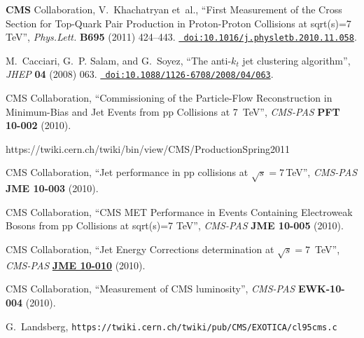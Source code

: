 \begin{thebibliography}{10}
{\bf CMS} Collaboration, V.~Khachatryan {et~al.}, ``{First Measurement of the
  Cross Section for Top-Quark Pair Production in Proton-Proton Collisions at
  sqrt(s)=7 TeV}'', {\em Phys.Lett.} {\bf B695} (2011) 424--443.
  \href{http://dx.doi.org/10.1016/j.physletb.2010.11.058}{{\tt
  doi:10.1016/j.physletb.2010.11.058}}.

M.~Cacciari, G.~P. Salam, and G.~Soyez, ``{The anti-{$k_t$} jet clustering
  algorithm}'', {\em JHEP} {\bf 04} (2008)
063.
  \href{http://dx.doi.org/10.1088/1126-6708/2008/04/063}{{\tt
  doi:10.1088/1126-6708/2008/04/063}}.

{CMS Collaboration}, ``Commissioning of the Particle-Flow Reconstruction in
  Minimum-Bias and Jet Events from pp Collisions at 7~TeV'', {\em CMS-PAS} {\bf
  PFT 10-002} (2010).

https://twiki.cern.ch/twiki/bin/view/CMS/ProductionSpring2011

{CMS Collaboration}, ``Jet performance in pp collisions at $\sqrt{s} =
  7$\,TeV'', {\em CMS-PAS} {\bf JME 10-003} (2010).

{CMS Collaboration}, ``CMS MET Performance in Events Containing Electroweak
  Bosons from pp Collisions at sqrt(s)=7 TeV'', {\em CMS-PAS} {\bf JME 10-005}
  (2010).







{CMS Collaboration}, ``Jet Energy Corrections determination at
  {$\sqrt{s}=7$}~TeV'', {\em CMS-PAS} {\bf
  \href{http://cdsweb.cern.ch/record/1308178}{JME 10-010}} (2010).

{CMS Collaboration}, ``Measurement of CMS luminosity'', {\em CMS-PAS} {\bf
  EWK-10-004} (2010).

 G.~Landsberg, {\tt https://twiki.cern.ch/twiki/pub/CMS/EXOTICA/cl95cms.c}

\end{thebibliography}\endgroup
